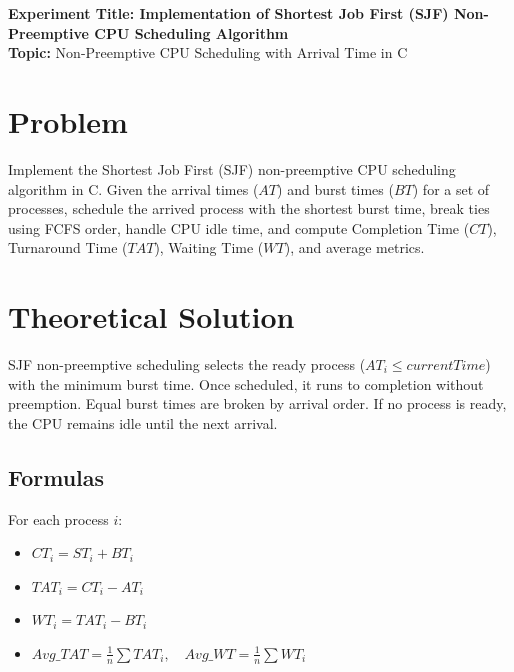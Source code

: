 \documentclass[10pt,a4paper]{article}
\begin{document}
\raggedbottom
\thispagestyle{firstpage}

\begin{center}
  {\Large\bfseries\sffamily\color{primary} Experiment Title: Implementation of Shortest Job First (SJF) Non-Preemptive CPU Scheduling Algorithm}\\[3pt]
  {\normalsize\sffamily\textbf{Topic:} Non-Preemptive CPU Scheduling with Arrival Time in C}
\end{center}
\vspace{-4pt}

\section{Problem}
Implement the Shortest Job First (SJF) non-preemptive CPU scheduling algorithm in C. Given the arrival times ($AT$) and burst times ($BT$) for a set of processes, schedule the arrived process with the shortest burst time, break ties using FCFS order, handle CPU idle time, and compute Completion Time ($CT$), Turnaround Time ($TAT$), Waiting Time ($WT$), and average metrics.

\section{Theoretical Solution}
SJF non-preemptive scheduling selects the ready process ($AT_i \le currentTime$) with the minimum burst time. Once scheduled, it runs to completion without preemption. Equal burst times are broken by arrival order. If no process is ready, the CPU remains idle until the next arrival.

\subsection{Formulas}
For each process $i$:
\begin{itemize}[noitemsep,topsep=1pt,leftmargin=1.2em]
  \item $CT_i = ST_i + BT_i$
  \item $TAT_i = CT_i - AT_i$
  \item $WT_i = TAT_i - BT_i$
  \item $Avg\_TAT = \frac{1}{n} \sum TAT_i, \quad Avg\_WT = \frac{1}{n} \sum WT_i$
\end{itemize}
\end{document}
